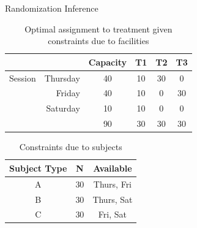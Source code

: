 \documentclass[
  11pt,
  ignorenonframetext,
]{beamer}
\begin{document}
\begin{frame}{Randomization Inference}
\protect\hypertarget{randomization-inference-4}{}
\begin{table}
  \centering
  \caption{Optimal assignment to treatment given constraints due to facilities}
    \begin{tabular}{rrcccc}
          &       & Capacity & T1    & T2    & T3 \\ \hline
    Session & Thursday & 40    & 10    & 30    & 0 \\
          & Friday & 40    & 10    & 0     & 30 \\
          & Saturday & 10    & 10    & 0     & 0 \\ \hline
          &       & 90    & 30    & 30    & 30 \\ \hline
    \end{tabular}
\end{table}

\begin{table}[htbp] \small
  \centering
  \caption{Constraints due to subjects}
    \begin{tabular}{ccc}
    Subject Type & N     & Available \\ \hline
    A     & 30    & Thurs, Fri \\
    B     & 30    & Thurs, Sat \\
    C     & 30    & Fri, Sat \\ \hline
    \end{tabular}
\end{table}
\end{frame}
\end{document}
